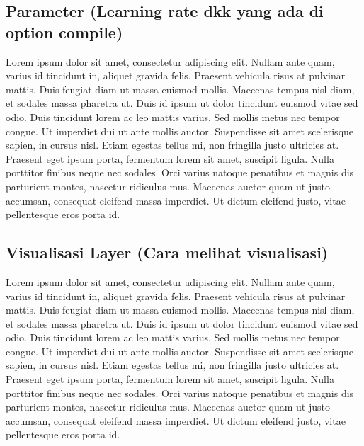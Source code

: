 \subsection{ Parameter (Learning rate dkk yang ada di option compile)}
Lorem ipsum dolor sit amet, consectetur adipiscing elit. Nullam ante quam, varius id tincidunt in, aliquet gravida felis. Praesent vehicula risus at pulvinar mattis. Duis feugiat diam ut massa euismod mollis. Maecenas tempus nisl diam, et sodales massa pharetra ut. Duis id ipsum ut dolor tincidunt euismod vitae sed odio. Duis tincidunt lorem ac leo mattis varius. Sed mollis metus nec tempor congue. Ut imperdiet dui ut ante mollis auctor. Suspendisse sit amet scelerisque sapien, in cursus nisl. Etiam egestas tellus mi, non fringilla justo ultricies at. Praesent eget ipsum porta, fermentum lorem sit amet, suscipit ligula. Nulla porttitor finibus neque nec sodales. Orci varius natoque penatibus et magnis dis parturient montes, nascetur ridiculus mus. Maecenas auctor quam ut justo accumsan, consequat eleifend massa imperdiet. Ut dictum eleifend justo, vitae pellentesque eros porta id.

\subsection{ Visualisasi Layer (Cara melihat visualisasi)}
Lorem ipsum dolor sit amet, consectetur adipiscing elit. Nullam ante quam, varius id tincidunt in, aliquet gravida felis. Praesent vehicula risus at pulvinar mattis. Duis feugiat diam ut massa euismod mollis. Maecenas tempus nisl diam, et sodales massa pharetra ut. Duis id ipsum ut dolor tincidunt euismod vitae sed odio. Duis tincidunt lorem ac leo mattis varius. Sed mollis metus nec tempor congue. Ut imperdiet dui ut ante mollis auctor. Suspendisse sit amet scelerisque sapien, in cursus nisl. Etiam egestas tellus mi, non fringilla justo ultricies at. Praesent eget ipsum porta, fermentum lorem sit amet, suscipit ligula. Nulla porttitor finibus neque nec sodales. Orci varius natoque penatibus et magnis dis parturient montes, nascetur ridiculus mus. Maecenas auctor quam ut justo accumsan, consequat eleifend massa imperdiet. Ut dictum eleifend justo, vitae pellentesque eros porta id.
